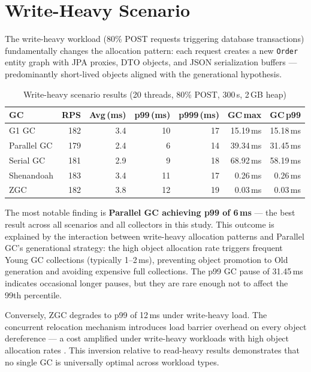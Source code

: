 \section{Write-Heavy Scenario}
\label{sec:results-write}

The write-heavy workload (80\% POST requests triggering database transactions) fundamentally changes the allocation pattern: each request creates a new \texttt{Order} entity graph with JPA proxies, DTO objects, and JSON serialization buffers --- predominantly short-lived objects aligned with the generational hypothesis.

\begin{table}[htbp]
\centering
\caption{Write-heavy scenario results (20 threads, 80\% POST, 300\,s, 2\,GB heap)}
\label{tab:results-write}
\begin{tabular}{lrrrrrr}
\hline
\textbf{GC} & \textbf{RPS} & \textbf{Avg\,(ms)} & \textbf{p99\,(ms)} & \textbf{p999\,(ms)} & \textbf{GC\,max} & \textbf{GC\,p99} \\
\hline
G1 GC       & 182 & 3.4 & 10 & 17 & 15.19\,ms & 15.18\,ms \\
Parallel GC & 179 & 2.4 &  6 & 14 & 39.34\,ms & 31.45\,ms \\
Serial GC   & 181 & 2.9 &  9 & 18 & 68.92\,ms & 58.19\,ms \\
Shenandoah  & 183 & 3.4 & 11 & 17 &  0.26\,ms &  0.26\,ms \\
ZGC         & 182 & 3.8 & 12 & 19 &  0.03\,ms &  0.03\,ms \\
\hline
\end{tabular}
\end{table}

The most notable finding is \textbf{Parallel GC achieving p99 of 6\,ms} --- the best result across all scenarios and all collectors in this study. This outcome is explained by the interaction between write-heavy allocation patterns and Parallel GC's generational strategy: the high object allocation rate triggers frequent Young GC collections (typically 1--2\,ms), preventing object promotion to Old generation and avoiding expensive full collections. The p99 GC pause of 31.45\,ms indicates occasional longer pauses, but they are rare enough not to affect the 99th percentile.

Conversely, ZGC degrades to p99 of 12\,ms under write-heavy load. The concurrent relocation mechanism introduces load barrier overhead on every object dereference --- a cost amplified under write-heavy workloads with high object allocation rates \cite{oracle2023gc}. This inversion relative to read-heavy results demonstrates that no single GC is universally optimal across workload types.

